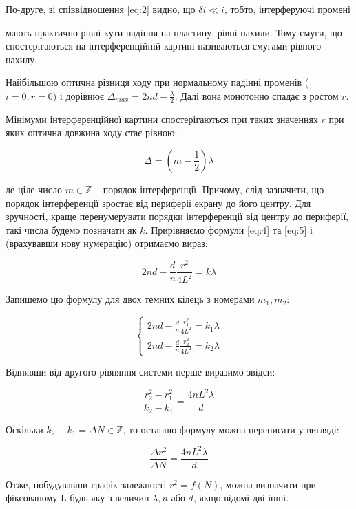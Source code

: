 По-друге, зі співвідношення \ref{eq:2} видно, що
$\delta i \ll i$, тобто, інтерферуючі промені

мають практично рівні кути падіння на пластину,
рівні нахили. Тому смуги, що спостерігаються
на інтерференційній картині називаються смугами рівного нахилу.


Найбільшою оптична різниця ходу при нормальному падінні променів
($i = 0, r = 0$) і дорівнює $\Delta_{max} = 2nd - \frac{\lambda}{2}$.
Далі вона монотонно спадає з ростом $r$.


Мінімуми інтерференційної картини спостерігаються при таких значеннях
$r$ при яких оптична довжина ходу стає рівною:

\begin{equation} \label{eq:5}
    \Delta = \left( m - \frac{1}{2} \right) \lambda
\end{equation}

де ціле число $m \in \mathbb{Z}$ – порядок інтерференції. Причому, слід зазначити,
що порядок інтерференції зростає від периферії екрану до його центру. Для
зручності, краще перенумерувати порядки інтерференції від центру до периферії,
такі числа будемо позначати як $k$.
Прирівняємо формули \ref{eq:4} та \ref{eq:5} і (врахувавши нову нумерацію)
отримаємо вираз:

$$ 2nd - \frac{d}{n} \frac{r^2}{4L^2} = k \lambda $$


Запишемо цю формулу для двох темних кілець з номерами $m_1, m_2$:

$$
\begin{cases} 
    2nd - \frac{d}{n} \frac{r_1^2}{4L^2} = k_1 \lambda \\[1em]
    2nd - \frac{d}{n} \frac{r_2^2}{4L^2} = k_2 \lambda
\end{cases}
$$

Віднявши від другого рівняння системи перше виразимо звідси:

$$ \frac{r_2^2 - r_1^2}{k_2 - k_1} = \frac{4nL^2 \lambda}{d} $$

Оскільки $ k_2 - k_1 = \Delta N \in \mathbb{Z} $,
то останню формулу можна переписати у вигляді:

\begin{equation} \label{eq:6}
    \frac{\Delta r^2}{\Delta N} = \frac{4nL^2 \lambda}{d}
\end{equation}

Отже, побудувавши графік залежності 
$r^2 = f(N)$, можна визначити при фіксованому L
будь-яку з величин $\lambda, n$ або $d$, якщо відомі дві інші.


